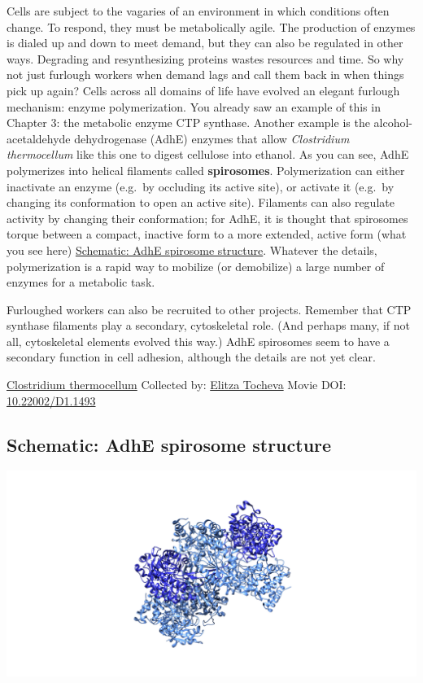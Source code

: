 \documentclass[]{tufte-book}
\begin{document}
Cells are subject to the vagaries of an environment in which conditions often change. To respond, they must be metabolically agile. The production of enzymes is dialed up and down to meet demand, but they can also be regulated in other ways. Degrading and resynthesizing proteins wastes resources and time. So why not just furlough workers when demand lags and call them back in when things pick up again? Cells across all domains of life have evolved an elegant furlough mechanism: enzyme polymerization. You already saw an example of this in Chapter 3: the metabolic enzyme CTP synthase. Another example is the alcohol-acetaldehyde dehydrogenase (AdhE) enzymes that allow \emph{Clostridium thermocellum} like this one to digest cellulose into ethanol. As you can see, AdhE polymerizes into helical filaments called \textbf{spirosomes}. Polymerization can either inactivate an enzyme (e.g.~by occluding its active site), or activate it (e.g.~by changing its conformation to open an active site). Filaments can also regulate activity by changing their conformation; for AdhE, it is thought that spirosomes torque between a compact, inactive form to a more extended, active form (what you see here) \protect\hyperlink{AdhE_spirosome_structure}{Schematic: AdhE spirosome structure}. Whatever the details, polymerization is a rapid way to mobilize (or demobilize) a large number of enzymes for a metabolic task.

Furloughed workers can also be recruited to other projects. Remember that CTP synthase filaments play a secondary, cytoskeletal role. (And perhaps many, if not all, cytoskeletal elements evolved this way.) AdhE spirosomes seem to have a secondary function in cell adhesion, although the details are not yet clear.



\hypertarget{htmlwidget-4737bff74cab8f8afcf5}{}

\label{fig:4-5}\protect\hyperlink{tree}{Clostridium thermocellum} Collected by: \protect\hyperlink{elitza_tocheva}{Elitza Tocheva} Movie DOI: \href{https://doi.org/10.22002/D1.1493}{10.22002/D1.1493}

\hypertarget{AdhE_spirosome_structure}{%
\subsection*{Schematic: AdhE spirosome structure}\label{AdhE_spirosome_structure}}

\includegraphics{img/schematics/4_5_1}
\end{document}
